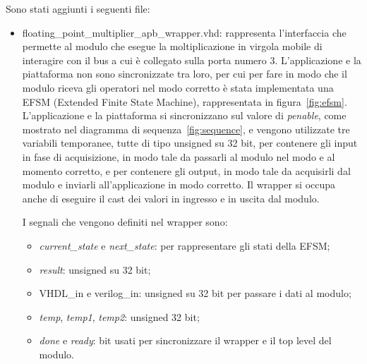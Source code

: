 \documentclass[]{IEEEtran}
\begin{document}
	Sono stati aggiunti i seguenti file:
	\begin{itemize}
		\item floating\_point\_multiplier\_apb\_wrapper.vhd: rappresenta l'interfaccia che permette al modulo che esegue la moltiplicazione in virgola mobile di interagire con il bus a cui \`e collegato sulla porta numero 3. L'applicazione e la piattaforma non sono sincronizzate tra loro, per cui per fare in modo che il modulo riceva gli operatori nel modo corretto \`e stata implementata una EFSM (Extended Finite State Machine), rappresentata in figura~\ref{fig:efsm}. L'applicazione e la piattaforma si sincronizzano sul valore di \textit{penable}, come mostrato nel diagramma di sequenza~\ref{fig:sequence}, e vengono utilizzate tre variabili temporanee, tutte di tipo unsigned su 32 bit, per contenere gli input in fase di acquisizione, in modo tale da passarli al modulo nel modo e al momento corretto, e per contenere gli output, in modo tale da acquisirli dal modulo e inviarli all'applicazione in modo corretto. Il wrapper si occupa anche di eseguire il cast dei valori in ingresso e in uscita dal modulo.

		I segnali che vengono definiti nel wrapper sono:
		\begin{itemize}
			\item \textit{current\_state} e \textit{next\_state}: per rappresentare gli stati della EFSM;
			\item \textit{result}: unsigned su 32 bit;
			\item VHDL\_in e verilog\_in: unsigned su 32 bit per passare i dati al modulo;
			\item \textit{temp}, \textit{temp1}, \textit{temp2}: unsigned 32 bit;
			\item \textit{done} e \textit{ready}: bit usati per sincronizzare il wrapper e il top level del modulo.
		\end{itemize}


\end{itemize}
\end{document}
